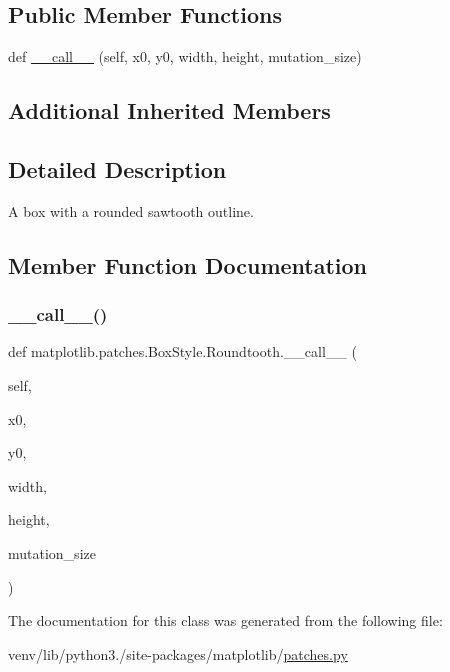 \subsection*{Public Member Functions}
\begin{DoxyCompactItemize}
\item 
def \hyperlink{classmatplotlib_1_1patches_1_1BoxStyle_1_1Roundtooth_abe34bfac3fa3ad9a6a318540d7586e9d}{\+\_\+\+\_\+call\+\_\+\+\_\+} (self, x0, y0, width, height, mutation\+\_\+size)
\end{DoxyCompactItemize}
\subsection*{Additional Inherited Members}


\subsection{Detailed Description}
\begin{DoxyVerb}A box with a rounded sawtooth outline.\end{DoxyVerb}
 

\subsection{Member Function Documentation}
\mbox{\label{classmatplotlib_1_1patches_1_1BoxStyle_1_1Roundtooth_abe34bfac3fa3ad9a6a318540d7586e9d}} 
\subsubsection{\texorpdfstring{\+\_\+\+\_\+call\+\_\+\+\_\+()}{\_\_call\_\_()}}
{\footnotesize\ttfamily def matplotlib.\+patches.\+Box\+Style.\+Roundtooth.\+\_\+\+\_\+call\+\_\+\+\_\+ (\begin{DoxyParamCaption}\item[{}]{self,  }\item[{}]{x0,  }\item[{}]{y0,  }\item[{}]{width,  }\item[{}]{height,  }\item[{}]{mutation\+\_\+size }\end{DoxyParamCaption})}



The documentation for this class was generated from the following file\+:\begin{DoxyCompactItemize}
\item 
venv/lib/python3./site-\/packages/matplotlib/\hyperlink{patches_8py}{patches.\+py}\end{DoxyCompactItemize}
